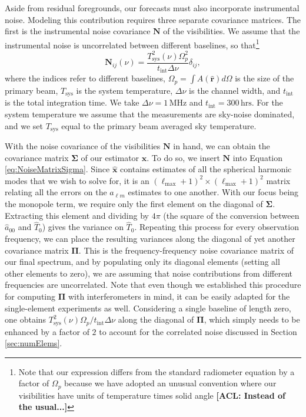 \documentclass[twocolumn,apj,numberedappendix]{emulateapj}
\newcommand{\xhat}{\hat{\mathbf{x}}}
\newcommand{\N}{\mathbf{N}}
\newcommand{\acl}[1]{{\color{red} \textbf{[ACL:  #1]}}}
\begin{document}
Aside from residual foregrounds, our forecasts must also incorporate instrumental noise. Modeling this contribution requires three separate covariance matrices. The first is the instrumental noise covariance $\N$ of the visibilities. We assume that the instrumental noise is uncorrelated between different baselines, so that\footnote{Note that our expression differs from the standard radiometer equation by a factor of $\Omega_p$ because we have adopted an unusual convention where our visibilities have units of temperature times solid angle\acl{Instead of the usual...}}
\begin{equation}
\N_{ij} (\nu) = \frac{T^2_\textrm{sys}(\nu) \Omega_p^2}{t_\textrm{int} \Delta \nu} \delta_{ij},
\end{equation}
where the indices refer to different baselines, $\Omega_p = \int  A(\mathbf{\hat{r}}) d\Omega$ is the size of the primary beam, $T_\textrm{sys}$ is the system temperature, $\Delta \nu$ is the channel width, and $t_\textrm{int}$ is the total integration time. We take $\Delta \nu = 1\,\textrm{MHz}$ and $t_\textrm{int} = 300\,\textrm{hrs}$. For the system temperature we assume that the measurements are sky-noise dominated, and we set $T_\textrm{sys}$ equal to the primary beam averaged sky temperature.

With the noise covariance of the visibilities $\N$ in hand, we can obtain the covariance matrix $\boldsymbol \Sigma$ of our estimator $\xhat$. To do so, we insert $\N$ into Equation \eqref{eq:NoiseMatrixSigma}. Since $\xhat$ contains estimates of all the spherical harmonic modes that we wish to solve for,   it is an $(\ell_\textrm{max} +1)^2 \times (\ell_\textrm{max}+1)^2$ matrix relating all the errors on the $a_{\ell m}$ estimates to one another. With our focus being the monopole term, we require only the first element on the diagonal of $\boldsymbol \Sigma$. Extracting this element and dividing by $4\pi$ (the square of the conversion between $\hat{a}_{00}$ and $\widehat{T}_0$) gives the variance on $\widehat{T}_0$. Repeating this process for every observation frequency, we can place the resulting variances along the diagonal of yet another covariance matrix $\boldsymbol \Pi$. This is the frequency-frequency noise covariance matrix of our final spectrum, and by populating only its diagonal elements (setting all other elements to zero), we are assuming that noise contributions from different frequencies are uncorrelated. Note that even though we established this procedure for computing $\boldsymbol \Pi$ with interferometers in mind, it can be easily adapted for the single-element experiments as well. Considering a single baseline of length zero, one obtains  $T^2_\textrm{sys}(\nu) \Omega_p / t_\textrm{int} \Delta \nu$ along the diagonal of $\boldsymbol \Pi$, which simply needs to be enhanced by a factor of $2$ to account for the correlated noise discussed in Section \ref{sec:numElems}.
\end{document}
